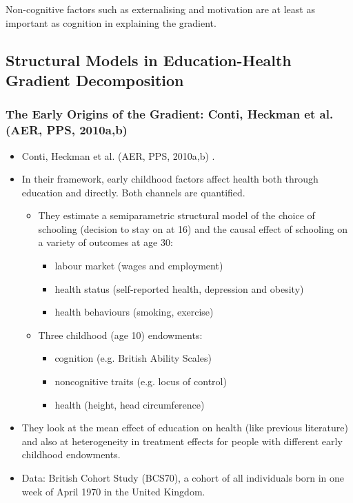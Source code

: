             Non-cognitive factors such as externalising and motivation are at least as important as cognition in explaining the gradient.

    \subsection{Structural Models in Education-Health Gradient Decomposition}\label{sec:structual_health}
        
        \subsubsection{The Early Origins of the Gradient: Conti, Heckman et al. (AER, PPS, 2010a,b)}

            \begin{itemize}
                \item Conti, Heckman et al. (AER, PPS, 2010a,b) . 
                \item In their framework, early childhood factors affect health both through education and directly. Both channels are quantified.
                    \begin{itemize}
                        \item They estimate a semiparametric structural model of the choice of schooling (decision to stay on at 16) and the causal effect of schooling on a variety of outcomes at age 30:
                        \begin{itemize}
                            \item labour market (wages and employment)
                            \item health status (self-reported health, depression and obesity)
                            \item health behaviours (smoking, exercise)
                        \end{itemize}
                        \item Three childhood (age 10) endowments:
                        \begin{itemize}
                            \item cognition (e.g. British Ability Scales)
                            \item noncognitive traits (e.g. locus of control)
                            \item health (height, head circumference)
                        \end{itemize}    
                    \end{itemize}
                \item They look at the mean effect of education on health (like previous literature) and also at heterogeneity in treatment effects for people with different early childhood endowments.
                \item Data: British Cohort Study (BCS70), a cohort of all individuals born in one week of April 1970 in the United Kingdom.
            \end{itemize}
            
